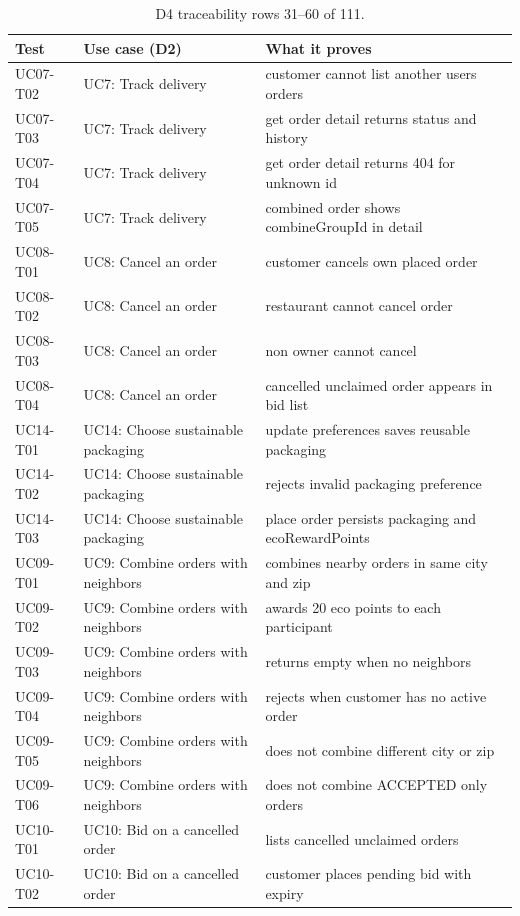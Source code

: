 \begin{table}[t]
\caption{D4 traceability rows 31--60 of 111.}
\label{tab:d4t2}
\centering\scriptsize
\begin{tabular}{p{3.2cm}p{4.0cm}p{5.8cm}}
\toprule
Test & Use case (D2) & What it proves \\
\midrule
UC07-T02 & UC7: Track delivery & customer cannot list another users orders \\
UC07-T03 & UC7: Track delivery & get order detail returns status and history \\
UC07-T04 & UC7: Track delivery & get order detail returns 404 for unknown id \\
UC07-T05 & UC7: Track delivery & combined order shows combineGroupId in detail \\
UC08-T01 & UC8: Cancel an order & customer cancels own placed order \\
UC08-T02 & UC8: Cancel an order & restaurant cannot cancel order \\
UC08-T03 & UC8: Cancel an order & non owner cannot cancel \\
UC08-T04 & UC8: Cancel an order & cancelled unclaimed order appears in bid list \\
UC14-T01 & UC14: Choose sustainable packaging & update preferences saves reusable packaging \\
UC14-T02 & UC14: Choose sustainable packaging & rejects invalid packaging preference \\
UC14-T03 & UC14: Choose sustainable packaging & place order persists packaging and ecoRewardPoints \\
UC09-T01 & UC9: Combine orders with neighbors & combines nearby orders in same city and zip \\
UC09-T02 & UC9: Combine orders with neighbors & awards 20 eco points to each participant \\
UC09-T03 & UC9: Combine orders with neighbors & returns empty when no neighbors \\
UC09-T04 & UC9: Combine orders with neighbors & rejects when customer has no active order \\
UC09-T05 & UC9: Combine orders with neighbors & does not combine different city or zip \\
UC09-T06 & UC9: Combine orders with neighbors & does not combine ACCEPTED only orders \\
UC10-T01 & UC10: Bid on a cancelled order & lists cancelled unclaimed orders \\
UC10-T02 & UC10: Bid on a cancelled order & customer places pending bid with expiry \\

\end{tabular}
\end{table}

